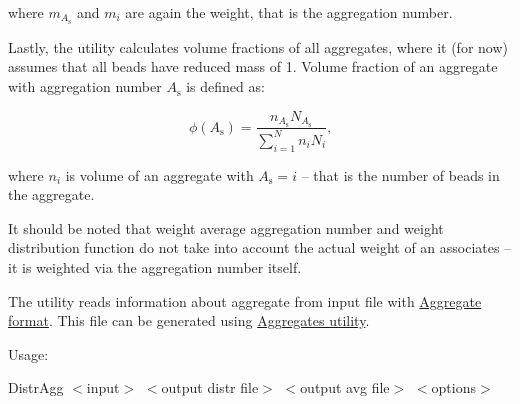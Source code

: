 where $m_{A_{\mathrm{s}} }$ and $m_i$ are again the weight, that is the
aggregation number.


Lastly, the utility calculates volume fractions of all aggregates, where it (for now) assumes that all beads have reduced mass of 1.  
Volume fraction of an aggregate with aggregation number $A_{\mathrm{s}}$ is
defined as:

\begin{equation}
\phi(A_{\mathrm{s}}) = \frac{n_{A_{\mathrm{s}}} N_{A_{\mathrm{s}}}}{\sum_{i=1}^N n_i N_i} \mbox{,}
\end{equation}

where $n_i$ is volume of an aggregate with $A_{\mathrm{s}} = i$ -- that is
the number of beads in the aggregate.

It should be noted that weight average aggregation number and weight
distribution function do not take into account the actual weight of an
associates -- it is weighted via the aggregation number itself.


The utility reads information about aggregate from input file with \hyperlink{InputFiles_AggregateFile}{Aggregate format}. This file can be generated using \hyperlink{Common_Aggregates}{Aggregates utility}.

Usage\+:

{\ttfamily Distr\+Agg $<$input$>$ $<$output distr file$>$ $<$output avg file$>$ $<$options$>$}

